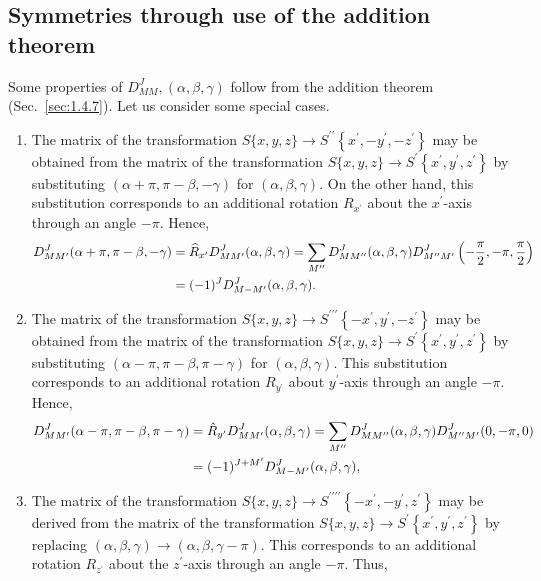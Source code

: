 \subsection{Symmetries through use of the addition theorem}
Some properties of $D_{M M}^{J},(\alpha, \beta, \gamma)$ follow from the addition theorem (Sec.~\ref{sec:1.4.7}). Let us consider some special cases.
\begin{enumerate}[label=(\roman*)]
\item The matrix of the transformation $S\{x, y, z\} \rightarrow S^{\prime \prime}\left\{x^{\prime},-y^{\prime},-z^{\prime}\right\}$ may be obtained from the matrix of the transformation $S\{x, y, z\} \rightarrow S^{\prime}\left\{x^{\prime}, y^{\prime}, z^{\prime}\right\}$ by substituting $(\alpha+\pi, \pi-\beta,-\gamma)$ for $(\alpha, \beta, \gamma)$. On the other hand, this substitution corresponds to an additional rotation $R_{x^{\prime}}$ about the $x^{\prime}$-axis through an angle $-\pi$. Hence,
\begin{align}
D_{M M^{\prime}}^{J}(\alpha+\pi, \pi-\beta,-\gamma) & =\widehat{R}_{x^{\prime}} D_{M M^{\prime}}^{J}(\alpha, \beta, \gamma)=\sum_{M^{\prime \prime}} D_{M M^{\prime \prime}}^{J}(\alpha, \beta, \gamma) D_{M^{\prime \prime} M^{\prime}}^{J}\left(-\frac{\pi}{2},-\pi, \frac{\pi}{2}\right)  \notag\\
& =(-1)^{J} D_{M-M^{\prime}}^{J}(\alpha, \beta, \gamma). \label{eq:4:4:6}
\end{align}
\item The matrix of the transformation $S\{x, y, z\} \rightarrow S^{\prime \prime \prime}\left\{-x^{\prime}, y^{\prime},-z^{\prime}\right\}$ may be obtained from the matrix of the transformation $S\{x, y, z\} \rightarrow S^{\prime}\left\{x^{\prime}, y^{\prime}, z^{\prime}\right\}$ by substituting $(\alpha-\pi, \pi-\beta, \pi-\gamma)$ for $(\alpha, \beta, \gamma)$. This substitution corresponds to an additional rotation $R_{y^{\prime}}$ about $y^{\prime}$-axis through an angle $-\pi$. Hence,
\begin{align}
D_{M M^{\prime}}^{J}(\alpha-\pi, \pi-\beta, \pi-\gamma) & =\hat{R}_{y^{\prime}} D_{M M^{\prime}}^{J}(\alpha, \beta, \gamma)=\sum_{M^{\prime \prime}} D_{M M^{\prime \prime}}^{J}(\alpha, \beta, \gamma) D_{M^{\prime \prime} M^{\prime}}^{J}(0,-\pi, 0)  \notag\\
& =(-1)^{J+M^{\prime}} D_{M-M^{\prime}}^{J}(\alpha, \beta, \gamma) ,\label{eq:4:4:7}
\end{align}
\item The matrix of the transformation $S\{x, y, z\} \rightarrow S^{\prime \prime \prime \prime}\left\{-x^{\prime},-y^{\prime}, z^{\prime}\right\}$ may be derived from the matrix of the transformation $S\{x, y, z\} \rightarrow S^{\prime}\left\{x^{\prime}, y^{\prime}, z^{\prime}\right\}$ by replacing $(\alpha, \beta, \gamma) \rightarrow(\alpha, \beta, \gamma-\pi)$. This corresponds to an additional rotation $R_{z^{\prime}}$ about the $z^{\prime}$-axis through an angle $-\pi$. Thus,

\end{enumerate}
